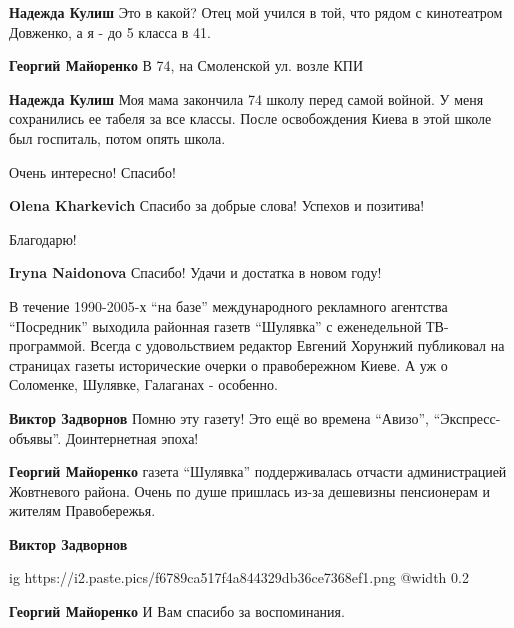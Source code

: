 \begin{itemize}
\begin{itemize}
\begin{itemize}
\textbf{Надежда Кулиш} Это в какой? Отец мой учился в той, что рядом с кинотеатром Довженко, а я - до 5 класса в 41.

\textbf{Георгий Майоренко} В 74, на Смоленской ул. возле КПИ

\textbf{Надежда Кулиш} Моя мама закончила 74 школу перед самой войной. У меня сохранились ее табеля за все классы. После освобождения Киева в этой школе был госпиталь, потом опять школа.
\end{itemize} %

\end{itemize} %

Очень интересно! Спасибо!

\textbf{Olena Kharkevich} Спасибо за добрые слова! Успехов и позитива!

Благодарю!

\textbf{Iryna Naidonova} Спасибо! Удачи и достатка в новом году!


В течение 1990-2005-х \enquote{на базе} международного рекламного агентства \enquote{Посредник}
выходила районная газетв \enquote{Шулявка} с еженедельной ТВ-программой. Всегда с
удовольствием редактор Евгений Хорунжий публиковал на страницах газеты
исторические очерки о правобережном Киеве. А уж о Соломенке, Шулявке, Галаганах
- особенно.

\begin{itemize} %
\textbf{Виктор Задворнов} Помню эту газету! Это ещё во времена \enquote{Авизо}, \enquote{Экспресс-объявы}. Доинтернетная эпоха!

\textbf{Георгий Майоренко} газета \enquote{Шулявка} поддерживалась отчасти администрацией Жовтневого района. Очень по душе пришлась из-за дешевизны пенсионерам и жителям Правобережья.

\textbf{Виктор Задворнов}

\ifcmt
  ig https://i2.paste.pics/f6789ca517f4a844329db36ce7368ef1.png
  @width 0.2
\fi

\textbf{Георгий Майоренко} И Вам спасибо за воспоминания.

\end{itemize} %



\end{itemize}
